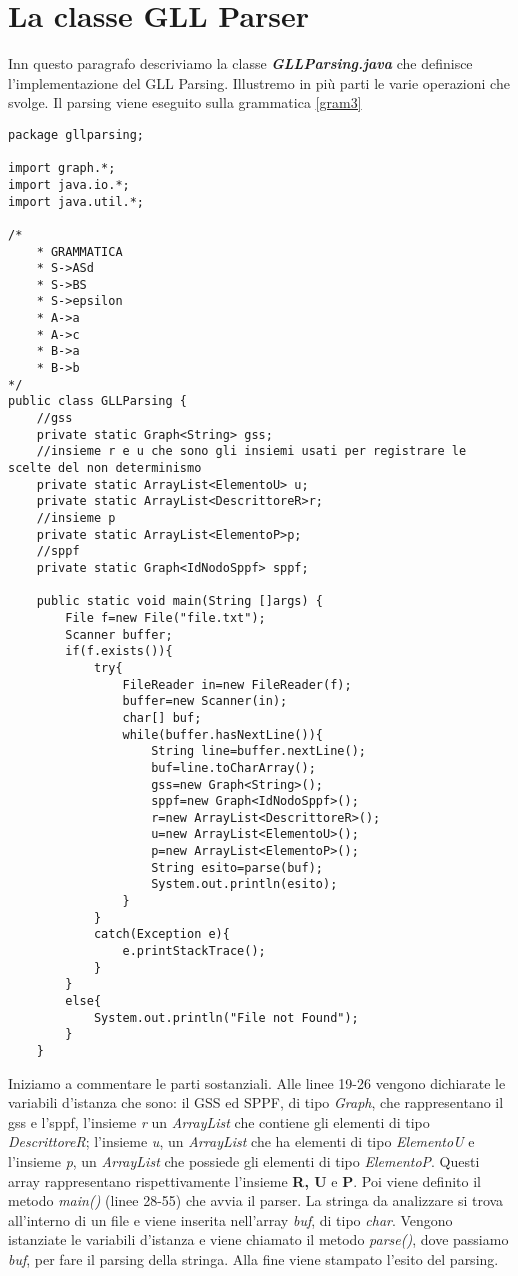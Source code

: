 \section{La classe GLL Parser}
Inn questo paragrafo descriviamo la classe \textbf{\textit{GLLParsing.java}} che definisce l'implementazione del GLL Parsing. Illustremo in più parti le varie operazioni che svolge. Il parsing viene eseguito sulla grammatica \ref{gram3} 
\begin{lstlisting}
package gllparsing;

import graph.*;
import java.io.*;
import java.util.*;
	
/*
	* GRAMMATICA
	* S->ASd
	* S->BS
	* S->epsilon
	* A->a
	* A->c
	* B->a
	* B->b
*/
public class GLLParsing {
	//gss
	private static Graph<String> gss;
	//insieme r e u che sono gli insiemi usati per registrare le scelte del non determinismo
	private static ArrayList<ElementoU> u;
	private static ArrayList<DescrittoreR>r;
	//insieme p
	private static ArrayList<ElementoP>p;
	//sppf
	private static Graph<IdNodoSppf> sppf;
	
	public static void main(String []args) {
		File f=new File("file.txt");
		Scanner buffer;
		if(f.exists()){
			try{
				FileReader in=new FileReader(f);
				buffer=new Scanner(in);
				char[] buf;
				while(buffer.hasNextLine()){
					String line=buffer.nextLine();
					buf=line.toCharArray();
					gss=new Graph<String>();
					sppf=new Graph<IdNodoSppf>();
					r=new ArrayList<DescrittoreR>();
					u=new ArrayList<ElementoU>();
					p=new ArrayList<ElementoP>();
					String esito=parse(buf);
					System.out.println(esito);
				}	
			}
			catch(Exception e){
				e.printStackTrace();
			}
		}
		else{
			System.out.println("File not Found");
		} 
	}	
\end{lstlisting}
Iniziamo a commentare le parti sostanziali. Alle linee 19-26 vengono dichiarate le variabili d'istanza che sono: il GSS ed SPPF, di tipo \textit{Graph}, che rappresentano il gss e l'sppf, l'insieme \textit{r} un \textit{ArrayList} che contiene gli elementi di tipo \textit{DescrittoreR}; l'insieme \textit{u}, un \textit{ArrayList} che ha elementi di tipo \textit{ElementoU} e l'insieme \textit{p}, un \textit{ArrayList} che possiede gli elementi di tipo \textit{ElementoP}. Questi array rappresentano rispettivamente l'insieme \textbf{R, U} e \textbf{P}. Poi viene definito il metodo \textit{main()} (linee 28-55) che avvia il parser. La stringa da analizzare si trova all'interno di un file e viene inserita nell'array \textit{buf}, di tipo \textit{char}. Vengono istanziate le variabili d'istanza e viene chiamato il metodo \textit{parse()}, dove passiamo \textit{buf}, per fare il parsing della stringa. Alla fine viene stampato l'esito del parsing.\\
